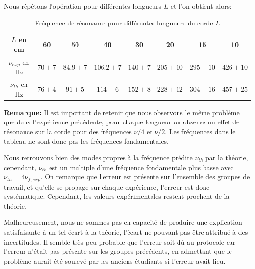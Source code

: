 \documentclass[12pt]{article}
\begin{document}
Nous répétons l'opération pour différentes longueurs $L$ et l'on obtient alors:

\begin{table}[h!]
	\centering
	\begin{tabular}{||c c c c c c c c||} 
		\hline
		$L$ en cm & 60 & 50 & 40 & 30 & 20 & 15 & 10 \\
		\hline
        $\nu_{exp}$ en Hz & $70 \pm 7$ & $84.9 \pm 7$ & $106.2 \pm 7$ & $140 \pm 7$ & $205 \pm 10$ & $295 \pm 10$ & $426 \pm 10$ \\
        $\nu_{th}$ en Hz & $76 \pm 4$ & $91 \pm 5$ & $114 \pm 6$ & $152 \pm 8$ & $228 \pm 12$ & $304 \pm 16$ & $457 \pm 25$ \\
		\hline
	\end{tabular}
	\caption{Fréquence de résonance pour différentes longueurs de corde $L$}
	\label{table:2}
\end{table}

\textbf{Remarque:} Il est important de retenir que nous observons le même problème que dans l'expérience précédente, pour chaque longueur on observe un effet de résonance sur la corde
pour des fréquences $\nu/4$ et $\nu / 2$. Les fréquences dans le tableau ne sont donc pas les fréquences fondamentales.

Nous retrouvons bien des modes propres à la fréquence prédite $\nu_{th}$ par la théorie, cependant, $\nu_{th}$ est un multiple d'une fréquence fondamentale plus basse avec $\nu_{th} = 4 \nu_{f,exp}$.
On remarque que l'erreur est présente sur l'ensemble des groupes de travail, et qu'elle se propage sur chaque expérience, l'erreur est donc systématique. Cependant, les valeurs expérimentales restent prochent
de la théorie.

Malheureusement, nous ne sommes pas en capacité de produire une explication satisfaisante à un tel écart à la théorie, l'écart ne pouvant pas être attribué à des incertitudes. Il semble très peu probable
que l'erreur soit dû au protocole car l'erreur n'était pas présente sur les groupes précédents, en admettant que le problème aurait été soulevé par les anciens étudiants si l'erreur avait lieu.
\end{document}
